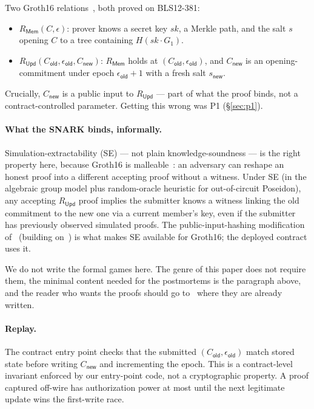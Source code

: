 \documentclass[11pt,a4paper]{article}
\newcommand{\Cold}{C_{\mathsf{old}}}
\newcommand{\Cnew}{C_{\mathsf{new}}}
\newcommand{\eold}{\epsilon_{\mathsf{old}}}
\newcommand{\snew}{s_{\mathsf{new}}}
\newcommand{\Rmem}{R_{\mathsf{Mem}}}
\newcommand{\Rupd}{R_{\mathsf{Upd}}}
\begin{document}
Two Groth16 relations~\cite{groth2016}, both proved on BLS12-381:

\begin{itemize}
  \item $\Rmem(C, \epsilon)$: prover knows a secret key $sk$, a Merkle path, and the salt $s$ opening $C$ to a tree containing $H(sk \cdot G_1)$.
  \item $\Rupd(\Cold, \eold, \Cnew)$: $\Rmem$ holds at $(\Cold, \eold)$, and $\Cnew$ is an opening-commitment under epoch $\eold + 1$ with a fresh salt $\snew$.
\end{itemize}

Crucially, $\Cnew$ is a public input to $\Rupd$ --- part of what the proof binds, not a contract-controlled parameter. Getting this wrong was P1 (\S\ref{sec:p1}).

\paragraph{What the SNARK binds, informally.}
Simulation-extractability (SE) --- not plain knowledge-soundness --- is the right property here, because Groth16 is malleable~\cite{grothmaller2017}: an adversary can reshape an honest proof into a different accepting proof without a witness. Under SE (in the algebraic group model plus random-oracle heuristic for out-of-circuit Poseidon), any accepting $\Rupd$ proof implies the submitter knows a witness linking the old commitment to the new one via a current member's key, even if the submitter has previously observed simulated proofs. The public-input-hashing modification of~\cite{baghery2021} (building on~\cite{lipmaa2019}) is what makes SE available for Groth16; the deployed contract uses it.

We do not write the formal games here. The genre of this paper does not require them, the minimal content needed for the postmortems is the paragraph above, and the reader who wants the proofs should go to~\cite{baghery2021, lipmaa2019, fuchsbauer2018agm} where they are already written.

\paragraph{Replay.}
The contract entry point checks that the submitted $(\Cold, \eold)$ match stored state before writing $\Cnew$ and incrementing the epoch. This is a contract-level invariant enforced by our entry-point code, not a cryptographic property. A proof captured off-wire has authorization power at most until the next legitimate update wins the first-write race.
\end{document}
